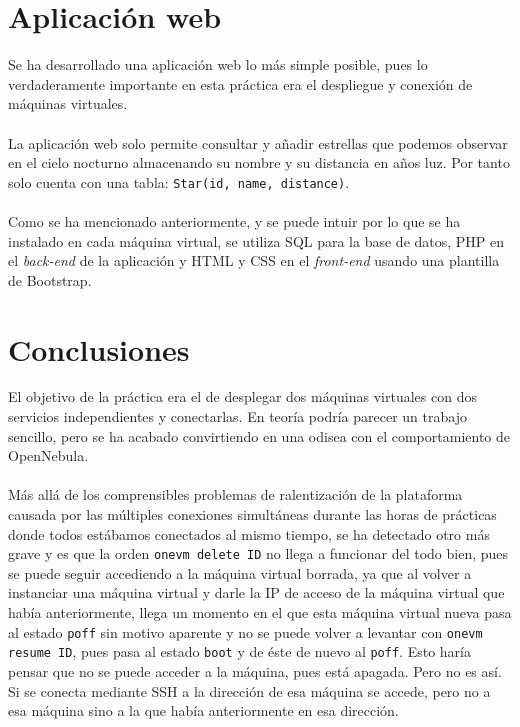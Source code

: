 \section{Aplicación web}

Se ha desarrollado una aplicación web lo más simple posible, pues lo verdaderamente importante en esta práctica era el despliegue y conexión de máquinas virtuales.
\\ \\
La aplicación web solo permite consultar y añadir estrellas que podemos observar en el cielo nocturno almacenando su nombre y su distancia en años luz. Por tanto solo cuenta con una tabla: \texttt{Star(id, name, distance)}.
\\ \\
Como se ha mencionado anteriormente, y se puede intuir por lo que se ha instalado en cada máquina virtual, se utiliza SQL para la base de datos, PHP en el \textit{back-end} de la aplicación y HTML y CSS en el \textit{front-end} usando una plantilla de Bootstrap.

\section{Conclusiones}

El objetivo de la práctica era el de desplegar dos máquinas virtuales con dos servicios independientes y conectarlas. En teoría podría parecer un trabajo sencillo, pero se ha acabado convirtiendo en una odisea con el comportamiento de OpenNebula.
\\ \\
Más allá de los comprensibles problemas de ralentización de la plataforma causada por las múltiples conexiones simultáneas durante las horas de prácticas donde todos estábamos conectados al mismo tiempo, se ha detectado otro más grave y es que la orden \texttt{onevm delete ID} no llega a funcionar del todo bien, pues se puede seguir accediendo a la máquina virtual borrada, ya que al volver a instanciar una máquina virtual y darle la IP de acceso de la máquina virtual que había anteriormente, llega un momento en el que esta máquina virtual nueva pasa al estado \texttt{poff} sin motivo aparente y no se puede volver a levantar con \texttt{onevm resume ID}, pues pasa al estado \texttt{boot} y de éste de nuevo al \texttt{poff}. Esto haría pensar que no se puede acceder a la máquina, pues está apagada. Pero no es así. Si se conecta mediante SSH a la dirección de esa máquina se accede, pero no a esa máquina sino a la que había anteriormente en esa dirección.

\newpage


